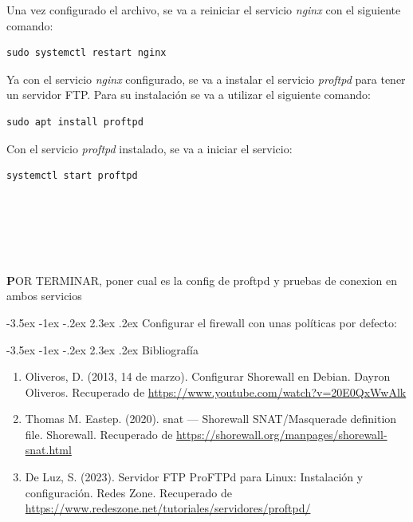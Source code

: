 \documentclass[11pt]{report}
\makeatletter
\renewcommand\chapter{\@startsection{chapter}{0}{\z@}%
    {-3.5ex \@plus -1ex \@minus -.2ex}%
    {2.3ex \@plus.2ex}%
    {\normalfont\Large\bfseries}}
\makeatother
\begin{document}
Una vez configurado el archivo, se va a reiniciar el servicio \emph{nginx} con el siguiente comando: \\
\begin{BVerbatim}
sudo systemctl restart nginx
\end{BVerbatim}

Ya con el servicio \emph{nginx} configurado, se va a instalar el servicio \emph{proftpd} para tener un servidor FTP. Para su instalación
se va a utilizar el siguiente comando:
\begin{BVerbatim}
sudo apt install proftpd
\end{BVerbatim}

Con el servicio \emph{proftpd} instalado, se va a iniciar el servicio:
\begin{BVerbatim}
systemctl start proftpd
\end{BVerbatim}
\\ 
\\ 
\\ 
\\
\\
\textbf POR TERMINAR, poner cual es la config de proftpd y pruebas de conexion en ambos servicios

\cleardoublepage

\chapter{Configurar el firewall con unas políticas por defecto: }



\cleardoublepage

\chapter{Bibliografía} %
\begin{enumerate}
\item Oliveros, D. (2013, 14 de marzo). Configurar Shorewall en Debian. Dayron Oliveros. Recuperado de \url{https://www.youtube.com/watch?v=20E0QxWwAlk}
\item Thomas M. Eastep. (2020). snat — Shorewall SNAT/Masquerade definition file. Shorewall. Recuperado de \url{https://shorewall.org/manpages/shorewall-snat.html}
\item De Luz, S. (2023). Servidor FTP ProFTPd para Linux: Instalación y configuración. Redes Zone. Recuperado de \url{https://www.redeszone.net/tutoriales/servidores/proftpd/}
\end{enumerate}
\end{document}

